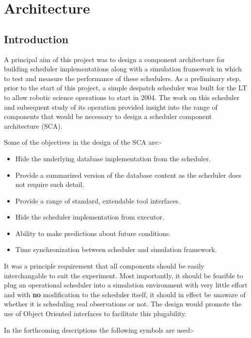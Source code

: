 \section{Architecture}
\label{sect:architecture}

\subsection{Introduction}
A principal aim of this project was to design a component architecture for building scheduler implementations along with a simulation framework in which to test and measure the performance of these schedulers. As a preliminary step, prior to the start of this project, a simple despatch scheduler \cite{fraser04scheduling} was built for the LT to allow robotic science operations to start in 2004. The work on this scheduler and subsequent study of its operation provided insight into the range of components that would be necessary to design a scheduler component architecture (SCA).

Some of the objectives in the design of the SCA \citep{fraser08observation} are:-
\begin{itemize}
\item Hide the underlying database implementation from the scheduler.
\item Provide a summarized version of the database content as the scheduler does not require such detail.
\item Provide a range of standard, extendable tool interfaces.
\item Hide the scheduler implementation from executor.
\item Ability to make predictions about future conditions.
\item Time synchronization between scheduler and simulation framework.
\end{itemize}

It was a principle requirement that all components should be easily interchangable to suit the experiment. Most importantly, it should be feasible to plug an operational scheduler into a simulation environment with very little effort and with {\bf no} modification to the scheduler itself, it should in effect be unaware of whether it is scheduling real observations or not. The design would promote the use of Object Oriented interfaces to facilitate this plugability.

In the forthcoming descriptions the following symbols are used:-

